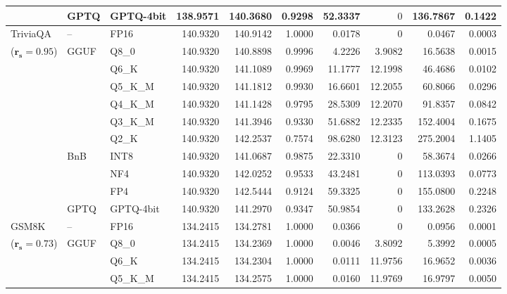 \begin{longtable}{ll l rrrrrrr}
 & GPTQ & GPTQ-4bit & 138.9571 & 140.3680 & \cellcolor{red!18} 0.9298 & \cellcolor{red!18} 52.3337 & \cellcolor{cyan!12} $0$ & \cellcolor{red!18} 136.7867 & \cellcolor{red!18} 0.1422 \\
\midrule
TriviaQA & -- & FP16 & 140.9320 & 140.9142 & 1.0000 & 0.0178 & \cellcolor{cyan!12} $0$ & 0.0467 & 0.0003 \\
{\small ($\mathbf{r_s{=}0.95}$)} & GGUF & Q8\_0 & 140.9320 & 140.8898 & 0.9996 & 4.2226 & 3.9082 & 16.5638 & 0.0015 \\
 &  & Q6\_K & 140.9320 & 141.1089 & 0.9969 & 11.1777 & 12.1998 & 46.4686 & 0.0102 \\
 &  & Q5\_K\_M & 140.9320 & 141.1812 & 0.9930 & 16.6601 & 12.2055 & 60.8066 & 0.0296 \\
 &  & Q4\_K\_M & 140.9320 & 141.1428 & 0.9795 & 28.5309 & 12.2070 & 91.8357 & 0.0842 \\
 &  & Q3\_K\_M & 140.9320 & 141.3946 & \cellcolor{red!18} 0.9330 & \cellcolor{red!18} 51.6882 & 12.2335 & \cellcolor{red!18} 152.4004 & \cellcolor{red!18} 0.1675 \\
 &  & Q2\_K & 140.9320 & 142.2537 & \cellcolor{red!35} 0.7574 & \cellcolor{red!35} 98.6280 & 12.3123 & \cellcolor{red!35} 275.2004 & \cellcolor{red!35} 1.1405 \\
 & BnB & INT8 & 140.9320 & 141.0687 & 0.9875 & 22.3310 & \cellcolor{cyan!12} $0$ & 58.3674 & 0.0266 \\
 &  & NF4 & 140.9320 & 142.0252 & 0.9533 & 43.2481 & \cellcolor{cyan!12} $0$ & 113.0393 & 0.0773 \\
 &  & FP4 & 140.9320 & 142.5444 & \cellcolor{red!18} 0.9124 & \cellcolor{red!18} 59.3325 & \cellcolor{cyan!12} $0$ & \cellcolor{red!18} 155.0800 & \cellcolor{red!18} 0.2248 \\
 & GPTQ & GPTQ-4bit & 140.9320 & 141.2970 & \cellcolor{red!18} 0.9347 & \cellcolor{red!18} 50.9854 & \cellcolor{cyan!12} $0$ & \cellcolor{red!18} 133.2628 & \cellcolor{red!18} 0.2326 \\
\midrule
GSM8K & -- & FP16 & 134.2415 & 134.2781 & 1.0000 & 0.0366 & \cellcolor{cyan!12} $0$ & 0.0956 & 0.0001 \\
{\small ($\mathbf{r_s{=}0.73}$)} & GGUF & Q8\_0 & 134.2415 & 134.2369 & 1.0000 & 0.0046 & 3.8092 & 5.3992 & 0.0005 \\
 &  & Q6\_K & 134.2415 & 134.2304 & 1.0000 & 0.0111 & 11.9756 & 16.9652 & 0.0036 \\
 &  & Q5\_K\_M & 134.2415 & 134.2575 & 1.0000 & 0.0160 & 11.9769 & 16.9797 & 0.0050 \\

\end{longtable}
